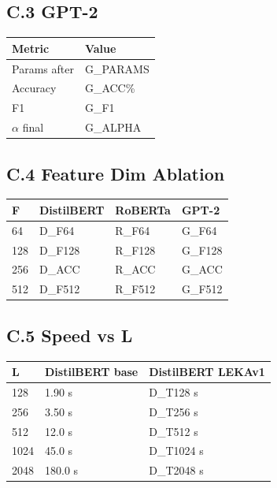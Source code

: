 \subsection{C.3 GPT-2}

\begin{table}[H]
\centering
\small
\begin{tabular}{ll}
\toprule
\textbf{Metric} & \textbf{Value} \\
\midrule
Params after & {{G\_PARAMS}} \\
Accuracy & {{G\_ACC}}\% \\
F1 & {{G\_F1}} \\
$\alpha$ final & {{G\_ALPHA}} \\
\bottomrule
\end{tabular}
\end{table}

\subsection{C.4 Feature Dim Ablation}

\begin{table}[H]
\centering
\small
\begin{tabular}{llll}
\toprule
\textbf{F} & \textbf{DistilBERT} & \textbf{RoBERTa} & \textbf{GPT-2} \\
\midrule
64 & {{D\_F64}} & {{R\_F64}} & {{G\_F64}} \\
128 & {{D\_F128}} & {{R\_F128}} & {{G\_F128}} \\
256 & {{D\_ACC}} & {{R\_ACC}} & {{G\_ACC}} \\
512 & {{D\_F512}} & {{R\_F512}} & {{G\_F512}} \\
\bottomrule
\end{tabular}
\end{table}

\subsection{C.5 Speed vs L}

\begin{table}[H]
\centering
\small
\begin{tabular}{lll}
\toprule
\textbf{L} & \textbf{DistilBERT base} & \textbf{DistilBERT LEKAv1} \\
\midrule
128 & 1.90 s & {{D\_T128}} s \\
256 & 3.50 s & {{D\_T256}} s \\
512 & 12.0 s & {{D\_T512}} s \\
1024 & 45.0 s & {{D\_T1024}} s \\
2048 & 180.0 s & {{D\_T2048}} s \\
\bottomrule
\end{tabular}
\end{table}

